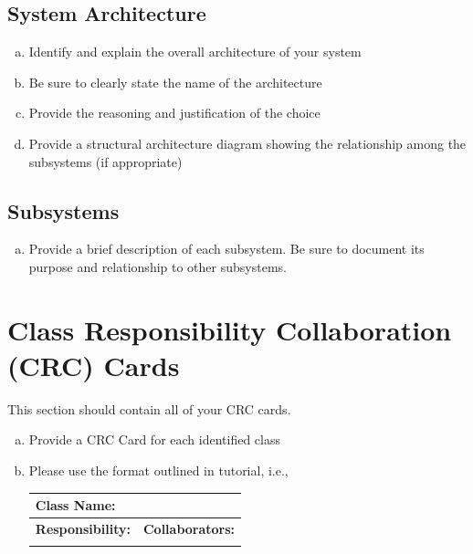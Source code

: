 \documentclass[12pt, titlepage]{article}
\begin{document}
\subsection{System Architecture}
\label{sub:system_architecture}
\begin{enumerate}[a)]
	\item Identify and explain the overall architecture of your system
	\item Be sure to clearly state the name of the architecture
	\item Provide the reasoning and justification of the choice
	\item Provide a structural architecture diagram showing the relationship among the subsystems (if appropriate)
\end{enumerate}

\subsection{Subsystems}
\label{sub:subsystems}
\begin{enumerate}[a)]
	\item Provide a brief description of each subsystem. Be sure to document its purpose and relationship to other subsystems.
\end{enumerate}

	
\section{Class Responsibility Collaboration (CRC) Cards}
\label{sec:class_responsibility_collaboration_crc_cards}
This section should contain all of your CRC cards.

\begin{enumerate}[a)]
	\item Provide a CRC Card for each identified class
	\item Please use the format outlined in tutorial, i.e., 
	\begin{table}[ht]
		\centering
		\begin{tabular}{|p{5cm}|p{5cm}|}
		\hline 
		 \multicolumn{2}{|l|}{\textbf{Class Name:}} \\
		\hline
		\textbf{Responsibility:} & \textbf{Collaborators:} \\
		\hline
		\vspace{1in} & \\
		\hline
		\end{tabular}
	\end{table}
	
\end{enumerate}
\end{document}
